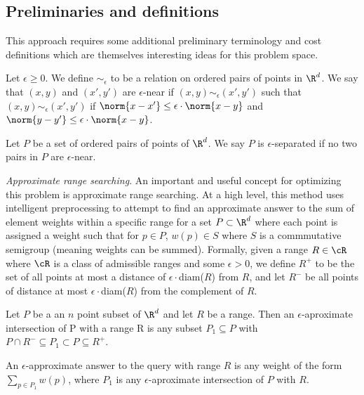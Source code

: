 \subsection{Preliminaries and definitions}

This approach requires some additional preliminary terminology and cost definitions which are themselves interesting ideas for this problem space.
\begin{definition}
  Let $\epsilon \geq 0$. We define $\sim_{\epsilon}$ to be a relation on ordered pairs of points in $\R^d$. We say that $(x,y)$ and $(x',y')$ are $\epsilon$-near if $(x,y) \sim_{\epsilon} (x', y')$ such that  $(x,y) \sim_{\epsilon} (x', y')$ if $\norm{x-x'} \leq \epsilon \cdot \norm{x-y}$ and $\norm{y - y'} \leq \epsilon \cdot \norm{x - y}$.
\end{definition}

\begin{definition}
Let $P$ be a set of ordered pairs of points of $\R^d$. We say $P$ is $\epsilon$-separated if no two pairs in $P$ are $\epsilon$-near.
\end{definition}

\noindent \emph{Approximate range searching}. An important and useful concept for optimizing this problem is approximate range searching. At a high level, this method uses intelligent preprocessing to attempt to find an approximate answer to the sum of element weights within a specific range for a set $P \subset \R^d$ where each point is assigned a weight such that for $p \in P$, $w(p) \in S$ where $S$ is a commmutative semigroup (meaning weights can be summed). Formally, given a range $R \in \cR$ where $\cR$ is a class of admissible ranges and some $\epsilon>0$, we define $R^+$ to be the set of all points at most a distance of $\epsilon \cdot$diam($R$) from $R$, and let $R^-$ be all points of distance at most $\epsilon \cdot$diam($R$) from the complement of $R$.

\begin{definition}
Let $P$ be a an $n$ point subset of $\R^d$ and let $R$ be a range. Then an $\epsilon$-aproximate intersection of P with a range R is any subset $P_1 \subseteq P$ with $P \cap R^- \subseteq P_1 \subset P \subseteq R^+$.
\end{definition}

\begin{definition}
An $\epsilon$-approximate answer to the query with range $R$ is any weight of the form $\sum_{p \in P_1} w(p)$, where $P_1$ is any $\epsilon$-aproximate intersection of $P$ with $R$.
\end{definition}

